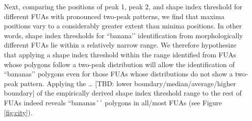 Next, comparing the positions of peak 1, peak 2, and shape index threshold for different
FUAs with pronounced two-peak patterns, we find that maxima positions vary to a
considerably greater extent than minima positions. In other words, shape index
thresholds for ``banana’’ identification from morphologically different FUAs lie within
a relatively narrow range. We therefore hypothesize that applying a shape index
threshold within the range identified from FUAs whose polygons follow a two-peak
distribution will allow the identification of ``bananas’’ polygons even for those FUAs
whose distributions do not show a two-peak pattern. Applying the … [TBD: lower
boundary/median/average/higher boundary] of the empirically derived shape index
threshold range to the rest of FUAs indeed reveals ``bananas´´ polygons in all/most FUAs
(see Figure \ref{fig:city}).